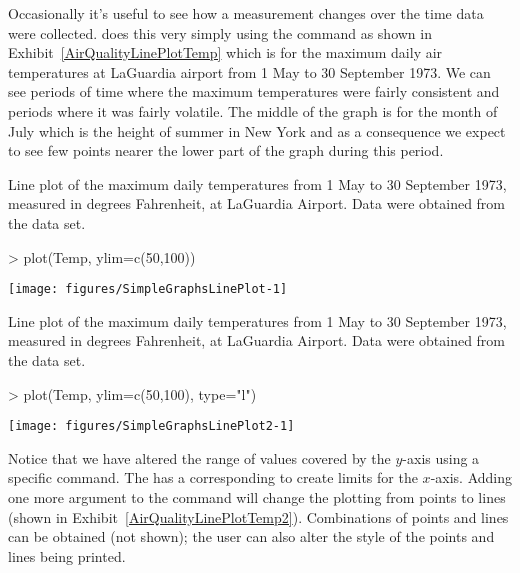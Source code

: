 Occasionally it's useful to see how a measurement changes over the time data were collected. \R{} does this very simply using the  command as shown in Exhibit~\ref{AirQualityLinePlotTemp} which is for the maximum daily air temperatures at LaGuardia airport from 1 May to 30 September 1973. We can see periods of time where the maximum temperatures were fairly consistent and periods where it was fairly volatile. The middle of the graph is for the month of July which is the height of summer in New York and as a consequence we expect to see few points nearer the lower part of the graph during this period. 
\begin{exhibit} 
\begin{center} 
\caption{Line plot of the maximum daily temperatures from 1 May to 30 September 1973, measured in degrees Fahrenheit, at LaGuardia Airport. Data were obtained from the  data set.} 
\label{AirQualityLinePlotTemp} 
\begin{Schunk}
\begin{Sinput}
> plot(Temp, ylim=c(50,100)) 
\end{Sinput}

\texttt{[image: figures/SimpleGraphsLinePlot-1]} \end{Schunk}
\end{center} 
\end{exhibit} 
\begin{exhibit} 
\begin{center} 
\caption{Line plot of the maximum daily temperatures from 1 May to 30 September 1973, measured in degrees Fahrenheit, at LaGuardia Airport. Data were obtained from the  data set.} 
\label{AirQualityLinePlotTemp2} 
\begin{Schunk}
\begin{Sinput}
> plot(Temp, ylim=c(50,100), type="l") 
\end{Sinput}

\texttt{[image: figures/SimpleGraphsLinePlot2-1]} \end{Schunk}
\end{center} 
\end{exhibit} 
 
 
Notice that we have altered the range of values covered by the $y$-axis using a specific command. The  has a corresponding  to create limits for the $x$-axis. Adding one more argument to the  command will change the plotting from points to lines (shown in Exhibit~\ref{AirQualityLinePlotTemp2}). Combinations of points and lines can be obtained (not shown); the user can also alter the style of the points and lines being printed. 
 
